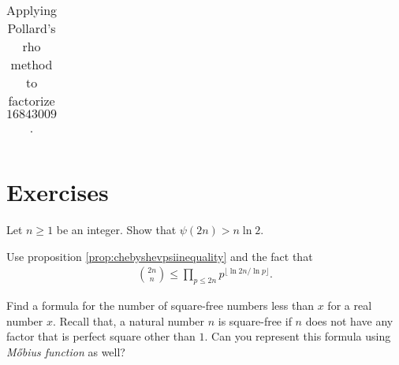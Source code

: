 \documentclass{subfiles}
\begin{document}
\begin{example}
\begin{table}
\begin{tabular}{|c|c|c|c|}
					\hline
				\end{tabular} 
				\caption{Applying Pollard's rho method to factorize $16843009$.}
				\label{table:pollardmodified}
		\end{table}
	\end{example}

\newpage
\section{Exercises}
	
	\begin{problem}
		Let $n \geq 1$ be an integer. Show that $\psi(2n) >n \ln 2$.
	\end{problem}
	
	\begin{hint}
		Use proposition \eqref{prop:chebyshevpsiinequality} and the fact that
			\begin{align*}
				\binom{2n}{n} \leq \prod_{p \leq 2n} p^{\lfloor\ln 2n/\ln p\rfloor }.
			\end{align*}
	\end{hint}
	
	\begin{problem}
		Find a formula for the number of square-free numbers less than $x$ for a real number $x$. Recall that, a natural number $n$ is square-free if $n$ does not have any factor that is perfect square other than $1$. Can you represent this formula using \textit{M\H obius function} as well?
	\end{problem}
	
\end{document}
